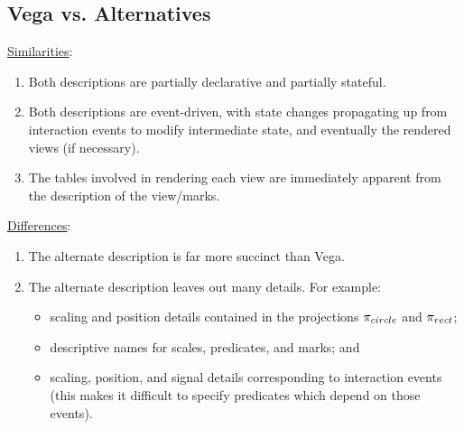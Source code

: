 \subsection{Vega vs. Alternatives}
\underline{Similarities}:
\begin{enumerate}
	\item Both descriptions are partially declarative and partially stateful.
	\item Both descriptions are event-driven, with state changes propagating up from interaction events to modify intermediate state, and eventually the rendered views (if necessary).
	\item The tables involved in rendering each view are immediately apparent from the description of the view/marks.
\end{enumerate}
\underline{Differences}:
\begin{enumerate}
	\item The alternate description is far more succinct than Vega.
	\item The alternate description leaves out many details.
		For example:
		\begin{itemize}
			\item scaling and position details contained in the projections $\mathlarger{\pi}_{circle}$ and $\mathlarger{\pi}_{rect}$;
			\item descriptive names for scales, predicates, and marks; and
			\item scaling, position, and signal details corresponding to interaction events (this makes it difficult to specify predicates which depend on those events).
		\end{itemize}
\end{enumerate}
